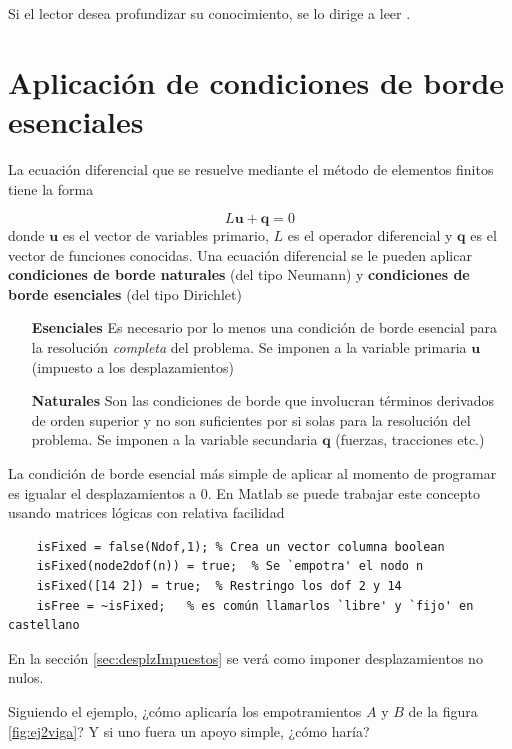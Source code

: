 \documentclass[11pt, a4paper,titlepage]{article}
\newcommand{\rmfont}[1]{{\fontfamily{ptm}\selectfont%
#1}}
\newcommand{\Matlab}{\rmfont{\sc Matlab}}
\begin{document}
Si el lector desea profundizar su conocimiento, se lo dirige a leer \citet{chessa2002programing}.


\section{Aplicación de condiciones de borde esenciales} \label{sec:condBordeEsenciales}
La ecuación diferencial que se resuelve mediante el método de elementos finitos tiene la forma

\begin{equation}  \label{eq:condBordeGeneralizada}
L\mathbf{u}+\mathbf{q}=0
\end{equation}
donde $\mathbf{u}$ es el vector de variables primario, $L$ es el operador diferencial y $\mathbf{q}$ es el vector de funciones conocidas. Una ecuación diferencial se le pueden aplicar \textbf{condiciones de borde naturales} (del tipo Neumann) y \textbf{condiciones de borde esenciales} (del tipo Dirichlet) \citep{dixit2007finite}
\begin{enumerate}
	\item[\textbf{Esenciales}] Es necesario por lo menos una condición de borde esencial para la resolución \textit{completa} del problema. Se imponen a la variable primaria $\mathbf{u}$ (impuesto a los desplazamientos)
	\item[\textbf{Naturales}] Son las condiciones de borde que involucran términos derivados de orden superior y no son suficientes por si solas para la resolución del problema. Se imponen a la variable secundaria $\mathbf{q}$ (fuerzas, tracciones etc.)
\end{enumerate}

La condición de borde esencial más simple de aplicar al momento de programar es igualar el desplazamientos a 0. En \Matlab{} se puede trabajar este concepto usando matrices lógicas con relativa facilidad
\begin{verbatim}
    isFixed = false(Ndof,1); % Crea un vector columna boolean
    isFixed(node2dof(n)) = true;  % Se `empotra' el nodo n
    isFixed([14 2]) = true;  % Restringo los dof 2 y 14
    isFree = ~isFixed;   % es común llamarlos `libre' y `fijo' en castellano
\end{verbatim}
En la sección \ref{sec:desplzImpuestos} se verá como imponer desplazamientos no nulos.

Siguiendo el ejemplo, ¿cómo aplicaría los empotramientos $A$ y $B$ de la figura \ref{fig:ej2viga}? Y si uno fuera un apoyo simple, ¿cómo haría? 
\end{document}
